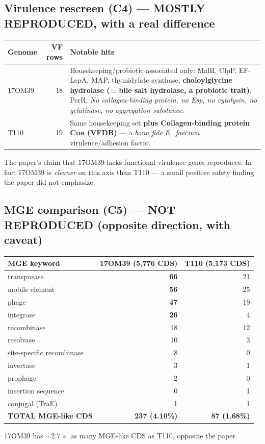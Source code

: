 \documentclass[11pt,a4paper]{article}
\begin{document}
\subsection{Virulence rescreen (C4) --- MOSTLY REPRODUCED, with a real difference}
\begin{longtable}{lrp{9.5cm}}
\toprule
Genome & VF rows & Notable hits \\
\midrule
17OM39 & 18 & Housekeeping/probiotic-associated only: MalR, ClpP, EF-LepA, MAP, thymidylate synthase, \textbf{choloylglycine hydrolase (= bile salt hydrolase, a probiotic trait)}, PerR. \emph{No collagen-binding protein, no Esp, no cytolysin, no gelatinase, no aggregation substance.} \\
T110   & 19 & Same housekeeping set \textbf{plus Collagen-binding protein Cna (VFDB)} --- a \emph{bona fide} \emph{E.\ faecium} virulence/adhesion factor. \\
\bottomrule
\end{longtable}
The paper's claim that 17OM39 lacks functional virulence genes reproduces. In fact 17OM39 is \emph{cleaner} on this axis than T110 --- a small positive safety finding the paper did not emphasize.

\subsection{MGE comparison (C5) --- NOT REPRODUCED (opposite direction, with caveat)}
\begin{longtable}{lrr}
\toprule
MGE keyword & 17OM39 (5{,}776 CDS) & T110 (5{,}173 CDS) \\
\midrule
transposase & \textbf{66} & 21 \\
mobile element & \textbf{56} & 25 \\
phage & \textbf{47} & 19 \\
integrase & \textbf{26} & 4 \\
recombinase & 18 & 12 \\
resolvase & 10 & 3 \\
site-specific recombinase & 8 & 0 \\
invertase & 3 & 1 \\
prophage & 2 & 0 \\
insertion sequence & 0 & 1 \\
conjugal (TraE) & 1 & 1 \\
\midrule
\textbf{TOTAL MGE-like CDS} & \textbf{237 (4.10\%)} & \textbf{87 (1.68\%)} \\
\bottomrule
\end{longtable}
17OM39 has $\sim 2.7\times$ as many MGE-like CDS as T110, opposite the paper.
\end{document}
